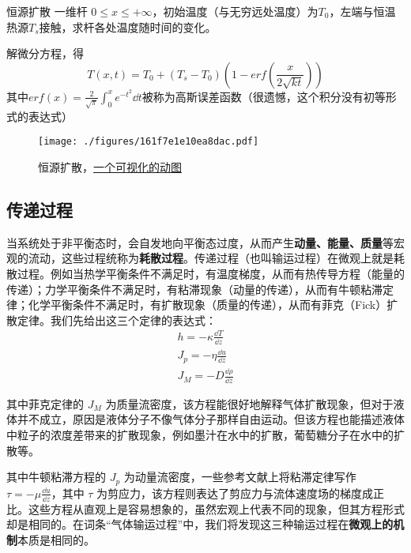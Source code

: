 \begin{example}{恒源扩散}
一维杆 $0\le x\le +\infty$，初始温度（与无穷远处温度）为$T_0$，左端与恒温热源$T_s$接触，求杆各处温度随时间的变化。

解微分方程，得
\begin{equation}
T(x,t)=T_0+(T_s-T_0)\left(1-erf\left(\frac{x}{2\sqrt{kt}}\right)\right)
\end{equation}
其中$erf(x)=\frac{2}{\sqrt{\pi}}\int^x_0 e^{-t^2} \dd t$被称为高斯误差函数（很遗憾，这个积分没有初等形式的表达式）

\begin{figure}[ht]
\centering
\texttt{[image: ./figures/161f7e1e10ea8dac.pdf]}
\caption{恒源扩散，\href{https://wuli.wiki/apps/diffus.html}{一个可视化的动图}} \label{fig_heatc_1}
\end{figure}
\end{example}

\subsection{传递过程}
当系统处于非平衡态时，会自发地向平衡态过度，从而产生\textbf{动量、能量、质量}等宏观的流动，这些过程统称为\textbf{耗散过程}。传递过程（也叫输运过程）在微观上就是耗散过程。例如当热学平衡条件不满足时，有温度梯度，从而有热传导方程（能量的传递）；力学平衡条件不满足时，有粘滞现象（动量的传递），从而有牛顿粘滞定律；化学平衡条件不满足时，有扩散现象（质量的传递），从而有菲克（Fick）扩散定律。我们先给出这三个定律的表达式：
\begin{align}
h=-\kappa \frac{\dd T}{\dd z}\\
J_p=-\eta \frac{\dd u}{\dd z}\\
J_M=-D\frac{\dd \rho}{\dd z}
\end{align}

其中菲克定律的 $J_M$ 为质量流密度，该方程能很好地解释气体扩散现象，但对于液体并不成立，原因是液体分子不像气体分子那样自由运动。但该方程也能描述液体中粒子的浓度差带来的扩散现象，例如墨汁在水中的扩散，葡萄糖分子在水中的扩散等。

其中牛顿粘滞方程的 $J_p$ 为动量流密度，一些参考文献上将粘滞定律写作 $\tau = -\mu \frac{\dd u}{\dd z}$，其中 $\tau$ 为剪应力，该方程则表达了剪应力与流体速度场的梯度成正比。这些方程从直观上是容易想象的，虽然宏观上代表不同的现象，但其方程形式却是相同的。在词条“气体输运过程”中，我们将发现这三种输运过程在\textbf{微观上的机制}本质是相同的。
